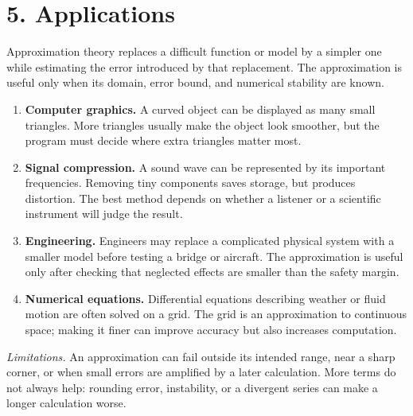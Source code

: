 \section*{5. Applications}
Approximation theory replaces a difficult function or model by a simpler one while estimating the error introduced by that replacement. The approximation is useful only when its domain, error bound, and numerical stability are known.
\begin{enumerate}[leftmargin=*,itemsep=0.35em]
\item \textbf{Computer graphics.} A curved object can be displayed as many small triangles. More triangles usually make the object look smoother, but the program must decide where extra triangles matter most.
\item \textbf{Signal compression.} A sound wave can be represented by its important frequencies. Removing tiny components saves storage, but produces distortion. The best method depends on whether a listener or a scientific instrument will judge the result.
\item \textbf{Engineering.} Engineers may replace a complicated physical system with a smaller model before testing a bridge or aircraft. The approximation is useful only after checking that neglected effects are smaller than the safety margin.
\item \textbf{Numerical equations.} Differential equations describing weather or fluid motion are often solved on a grid. The grid is an approximation to continuous space; making it finer can improve accuracy but also increases computation.
\end{enumerate}
\noindent\emph{Limitations.} An approximation can fail outside its intended range, near a sharp corner, or when small errors are amplified by a later calculation. More terms do not always help: rounding error, instability, or a divergent series can make a longer calculation worse.
